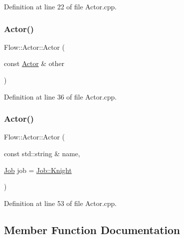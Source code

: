 Definition at line 22 of file Actor.\+cpp.

\hypertarget{class_flow_1_1_actor_a87c772011a71a40cba07f3f4122eeaec}{}\label{class_flow_1_1_actor_a87c772011a71a40cba07f3f4122eeaec} 
\subsubsection{\texorpdfstring{Actor()}{Actor()}\hspace{0.1cm}{\footnotesize\ttfamily [2/3]}}
{\footnotesize\ttfamily Flow\+::\+Actor\+::\+Actor (\begin{DoxyParamCaption}\item[{const \hyperlink{class_flow_1_1_actor}{Actor} \&}]{other }\end{DoxyParamCaption})}



Definition at line 36 of file Actor.\+cpp.

\hypertarget{class_flow_1_1_actor_a5e8bbbcb474e2c2122dc012849c71d77}{}\label{class_flow_1_1_actor_a5e8bbbcb474e2c2122dc012849c71d77} 
\subsubsection{\texorpdfstring{Actor()}{Actor()}\hspace{0.1cm}{\footnotesize\ttfamily [3/3]}}
{\footnotesize\ttfamily Flow\+::\+Actor\+::\+Actor (\begin{DoxyParamCaption}\item[{const std\+::string \&}]{name,  }\item[{\hyperlink{namespace_flow_a05bb774db920847e46f3779aaef1b07b}{Job}}]{job = {\ttfamily \hyperlink{namespace_flow_a05bb774db920847e46f3779aaef1b07ba8c23b2b86573edf2a5ea482c2ccc1497}{Job\+::\+Knight}} }\end{DoxyParamCaption})}



Definition at line 53 of file Actor.\+cpp.



\subsection{Member Function Documentation}
\hypertarget{class_flow_1_1_actor_afefe67bd3da9a846d7f6cadb865e2109}{}\label{class_flow_1_1_actor_afefe67bd3da9a846d7f6cadb865e2109} 
